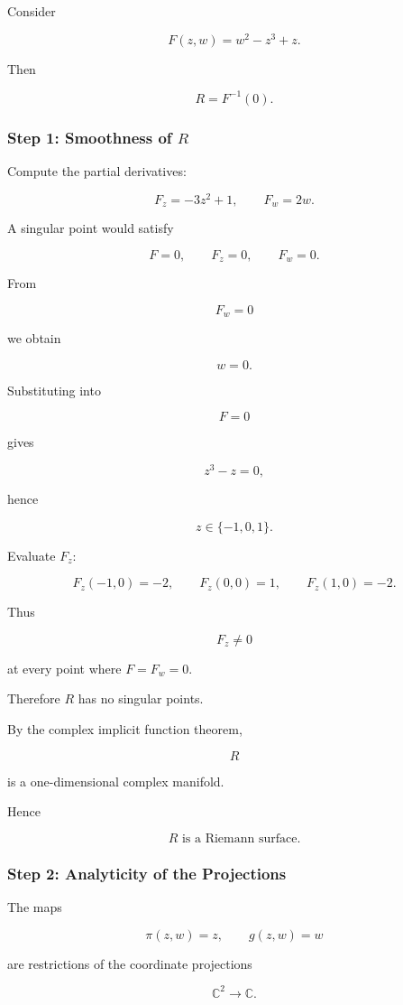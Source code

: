\documentclass[12pt,a4paper]{article}
\theoremstyle{notespace}
\begin{document}
Consider

\[
F(z,w)
=
w^2-z^3+z.
\]

Then

\[
R=F^{-1}(0).
\]

\subsubsection*{Step 1: Smoothness of \(R\)}

Compute the partial derivatives:

\[
F_z=-3z^2+1,
\qquad
F_w=2w.
\]

A singular point would satisfy

\[
F=0,
\qquad
F_z=0,
\qquad
F_w=0.
\]

From

\[
F_w=0
\]

we obtain

\[
w=0.
\]

Substituting into

\[
F=0
\]

gives

\[
z^3-z=0,
\]

hence

\[
z\in\{-1,0,1\}.
\]

Evaluate \(F_z\):

\[
F_z(-1,0)=-2,
\qquad
F_z(0,0)=1,
\qquad
F_z(1,0)=-2.
\]

Thus

\[
F_z\neq0
\]

at every point where \(F=F_w=0\).

Therefore \(R\) has no singular points.

By the complex implicit function theorem,

\[
R
\]

is a one-dimensional complex manifold.

Hence

\[
\boxed{
	R
	\text{ is a Riemann surface.}
}
\]

\subsubsection*{Step 2: Analyticity of the Projections}

The maps

\[
\pi(z,w)=z,
\qquad
g(z,w)=w
\]

are restrictions of the coordinate projections

\[
\mathbb C^2\to\mathbb C.
\]
\end{document}
